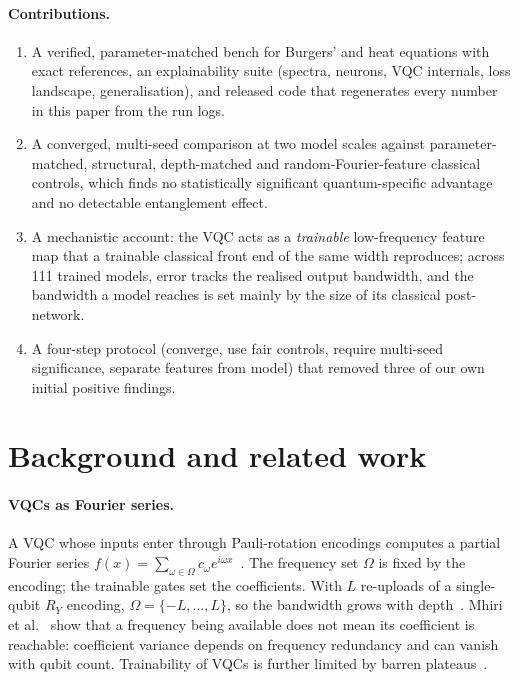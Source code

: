 \documentclass[11pt]{article}
\begin{document}
\paragraph{Contributions.}
\begin{enumerate}[nosep]
  \item A verified, parameter-matched bench for Burgers' and heat equations with exact
  references, an explainability suite (spectra, neurons, VQC internals, loss
  landscape, generalisation), and released code that regenerates every number in
  this paper from the run logs.
  \item A converged, multi-seed comparison at two model scales against parameter-matched,
  structural, depth-matched and random-Fourier-feature classical controls, which finds
  no statistically significant quantum-specific advantage and no detectable
  entanglement effect.
  \item A mechanistic account: the VQC acts as a \emph{trainable} low-frequency feature
  map that a trainable classical front end of the same width reproduces; across 111
  trained models, error tracks the realised output bandwidth, and the bandwidth a model
  reaches is set mainly by the size of its classical post-network.
  \item A four-step protocol (converge, use fair controls, require multi-seed
  significance, separate features from model) that removed three of our own initial
  positive findings.
\end{enumerate}

\section{Background and related work}
\paragraph{VQCs as Fourier series.} A VQC whose inputs enter through Pauli-rotation
encodings computes a partial Fourier series
$f(x)=\sum_{\omega\in\Omega}c_\omega e^{i\omega x}$~\cite{schuld}. The frequency set
$\Omega$ is fixed by the encoding; the trainable gates set the coefficients. With $L$
re-uploads of a single-qubit $R_Y$ encoding, $\Omega=\{-L,\dots,L\}$, so the
bandwidth grows with depth~\cite{schuld,reupload}. Mhiri et al.~\cite{mhiri} show that
a frequency being available does not mean its coefficient is reachable: coefficient
variance depends on frequency redundancy and can vanish with qubit count. Trainability
of VQCs is further limited by barren plateaus~\cite{mcclean}.
\end{document}
